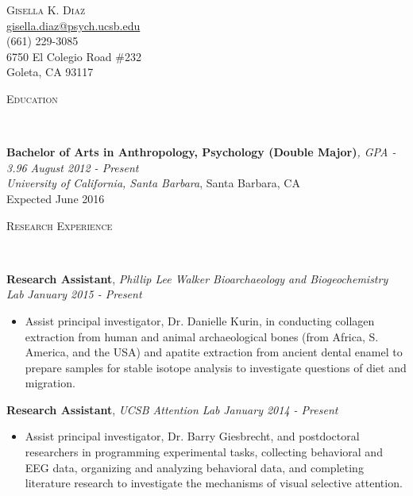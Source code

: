 \documentclass[10pt]{article}
\makeatletter
\newenvironment{changemargin}[2]{%
  \begin{list}{}{%
    \setlength{\topsep}{0pt}%
    \setlength{\leftmargin}{#1}%
    \setlength{\rightmargin}{#2}%
    \setlength{\listparindent}{\parindent}%
    \setlength{\itemindent}{\parindent}%
    \setlength{\parsep}{\parskip}%
  }%
  \item[]}{\end{list}
}
\newcommand{\lineover}{
	\begin{changemargin}{-0.05in}{-0.05in}
		\vspace*{-8pt}
		\hrulefill \\
		\vspace*{-2pt}
	\end{changemargin}
}
\newcommand{\header}[1]{
	\begin{changemargin}{-0.5in}{-0.5in}
		\scshape{#1}\\
  	\lineover
	\end{changemargin}
}
\newcommand{\contact}[5]{
	\begin{changemargin}{-0.5in}{-0.5in}
		\begin{center}
			{\Large \scshape {#1}}\\
      {\href{mailto:gisella.diaz@psych.ucsb.edu}{gisella.diaz@psych.ucsb.edu}} \\  {#3} \\ {#4} \\ {#5}
		\end{center}
	\end{changemargin}
}
\newcommand{\labdescription}[1]{
	\begin{changemargin}{0.15in}{0.15in}
    \smallskip
		{#1}
    \medskip
	\end{changemargin}
}
\newcommand{\labtitle}[3]{
	\textbf{#1}, \emph{#2} \hfill \emph{#3}\\
}
\newenvironment{body} {
	\vspace*{-16pt}
	\begin{changemargin}{-0.25in}{-0.5in}
  }
	{\end{changemargin}
}
\makeatother
\begin{document}

\contact{Gisella K. Diaz}{}{(661) 229-3085}{6750 El Colegio Road \#232}{Goleta, CA 93117}


\header{Education}

\begin{body}
	\vspace{14pt}
	\textbf{Bachelor of Arts in Anthropology, Psychology (Double Major)}\emph{, GPA - 3.96} \hfill \emph{August 2012 - Present} \\
	\emph{University of California, Santa Barbara}, Santa Barbara, CA \\
	Expected June 2016

\end{body}

\medskip


\header{Research Experience}

\begin{body}
	\vspace{14pt}

  	\labtitle{Research Assistant}{Phillip Lee Walker Bioarchaeology and Biogeochemistry Lab}{January 2015 - Present}
  \labdescription {
  	\begin{itemize} \itemsep -0pt  %
      \item Assist principal investigator, Dr. Danielle Kurin, in conducting collagen extraction from human and animal archaeological bones (from Africa, S. America, and the USA) and apatite extraction from ancient dental enamel to prepare samples for stable isotope analysis to investigate questions of diet and migration.
  	\end{itemize}
  }

	\labtitle{Research Assistant}{UCSB Attention Lab}{January 2014 - Present}
  \labdescription {
  	\begin{itemize} \itemsep -0pt  %
      \item Assist principal investigator, Dr. Barry Giesbrecht, and postdoctoral researchers in programming experimental tasks, collecting behavioral and EEG data, organizing and analyzing behavioral data, and completing literature research to investigate the mechanisms of visual selective attention.
  	\end{itemize}
  }


\end{body}
\end{document}
